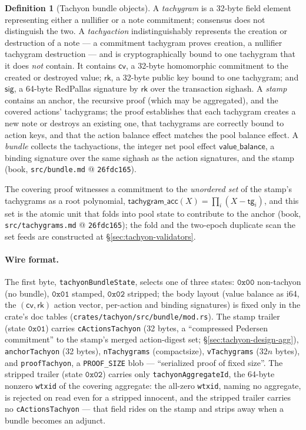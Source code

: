 \documentclass[11pt,a4paper]{article}
\theoremstyle{definition}
\newtheorem{definition}[theorem]{Definition}
\newcommand{\cvsym}{\mathsf{cv}}
\newcommand{\rk}{\mathsf{rk}}
\begin{document}
\begin{definition}[Tachyon bundle objects]\label{def:tachyon-design-bundle}
A \emph{tachygram} is a 32-byte field element representing either a
nullifier or a note commitment; consensus does not distinguish the two. A
\emph{tachyaction} indistinguishably represents the creation or
destruction of a note --- a commitment tachygram proves creation, a
nullifier tachygram destruction --- and is cryptographically bound to
one tachygram that it does \emph{not} contain. It contains
$\cvsym$, a 32-byte homomorphic commitment to the created or destroyed
value; $\rk$, a 32-byte public key bound to one tachygram; and
$\mathsf{sig}$, a 64-byte RedPallas signature by $\rk$ over the
transaction sighash. A \emph{stamp} contains an anchor, the recursive
proof (which may be aggregated), and the covered actions' tachygrams; the
proof establishes that each tachygram creates a new note or destroys an
existing one, that tachygrams are correctly bound to action keys, and that
the action balance effect matches the pool balance effect. A \emph{bundle}
collects the tachyactions, the integer net pool effect
$\mathsf{value\_balance}$, a binding signature over the same sighash as
the action signatures, and the stamp (book, \texttt{src/bundle.md} @
\texttt{26fdc165}).
\end{definition}

The covering proof witnesses a commitment to the \emph{unordered set} of
the stamp's tachygrams as a root polynomial,
$\mathsf{tachygram\_acc}(X) = \prod_i (X - \mathsf{tg}_i)$, and this set is
the atomic unit that folds into pool state to contribute to the anchor
(book, \texttt{src/tachygrams.md} @ \texttt{26fdc165}); the fold and the
two-epoch duplicate scan the set feeds are constructed at
\S\ref{sec:tachyon-validators}.

\paragraph{Wire format.} The first byte, \texttt{tachyonBundleState},
selects one of three states: $\mathtt{0x00}$ non-tachyon (no bundle),
$\mathtt{0x01}$ stamped, $\mathtt{0x02}$ stripped; the body layout (value
balance as i64, the $(\cvsym, \rk)$ action vector, per-action and binding
signatures) is fixed only in the crate's doc tables
(\texttt{crates/tachyon/src/bundle/mod.rs}). The stamp trailer (state
$\mathtt{0x01}$) carries \texttt{cActionsTachyon} (32 bytes, a
``compressed Pedersen commitment'' to the stamp's merged action-digest
set; \S\ref{sec:tachyon-design-agg}), \texttt{anchorTachyon} (32 bytes),
\texttt{nTachygrams} (compactsize), \texttt{vTachygrams} ($32n$ bytes),
and \texttt{proofTachyon}, a \texttt{PROOF\_SIZE} blob --- ``serialized
proof of fixed size''. The stripped trailer (state $\mathtt{0x02}$)
carries only \texttt{tachyonAggregateId}, the 64-byte nonzero
\texttt{wtxid} of the covering aggregate: the all-zero \texttt{wtxid},
naming no aggregate, is rejected on read even for a stripped innocent, and
the stripped trailer carries no \texttt{cActionsTachyon} --- that field
rides on the stamp and strips away when a bundle becomes an adjunct.
\end{document}

